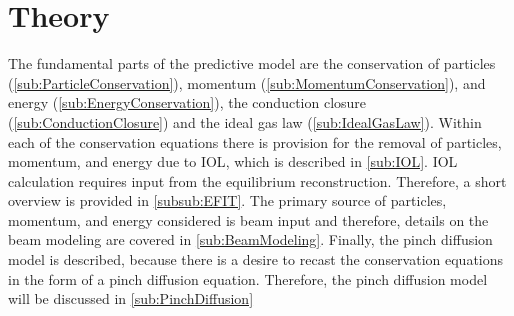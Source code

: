 \section{Theory} \label{sec:Theory}

The fundamental parts of the predictive model are the conservation of particles (\cref{sub:ParticleConservation}), momentum (\cref{sub:MomentumConservation}), and energy (\cref{sub:EnergyConservation}), the conduction closure (\cref{sub:ConductionClosure}) and the ideal gas law (\cref{sub:IdealGasLaw}). Within each of the conservation equations there is provision for the removal of particles, momentum, and energy due to \ac{IOL}, which is described in \cref{sub:IOL}. \ac{IOL} calculation requires input from the equilibrium reconstruction. Therefore, a short overview is provided in \cref{subsub:EFIT}.  The primary source of particles, momentum, and energy considered is beam input and therefore, details on the beam modeling are covered in \cref{sub:BeamModeling}. Finally, the pinch diffusion model is described, because there is a desire to recast the conservation equations in the form of a pinch diffusion equation. Therefore, the pinch diffusion model will be discussed in \cref{sub:PinchDiffusion}



%
%
%
%
%
%
%
%
%
%
%
%
%
%
%
%
%
%

